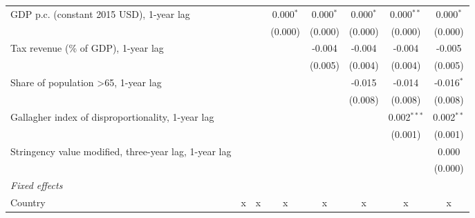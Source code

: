 \begin{table}[htbp]
\begin{tabular}{lccccccc}
      GDP p.c. (constant 2015 USD), 1-year lag                                  &              &              & 0.000$^{*}$    & 0.000$^{*}$    & 0.000$^{*}$    & 0.000$^{**}$   & 0.000$^{*}$\\   
                                                                                &              &              & (0.000)        & (0.000)        & (0.000)        & (0.000)        & (0.000)\\   
      Tax revenue (\% of GDP), 1-year lag                                       &              &              &                & -0.004         & -0.004         & -0.004         & -0.005\\   
                                                                                &              &              &                & (0.005)        & (0.004)        & (0.004)        & (0.005)\\   
      Share of population >65, 1-year lag                                       &              &              &                &                & -0.015         & -0.014         & -0.016$^{*}$\\   
                                                                                &              &              &                &                & (0.008)        & (0.008)        & (0.008)\\   
      Gallagher index of disproportionality, 1-year lag                         &              &              &                &                &                & 0.002$^{***}$  & 0.002$^{**}$\\   
                                                                                &              &              &                &                &                & (0.001)        & (0.001)\\   
      Stringency value modified, three-year lag, 1-year lag                     &              &              &                &                &                &                & 0.000\\   
                                                                                &              &              &                &                &                &                & (0.000)\\   
      \emph{Fixed effects}\\
      Country                                                                   & x            & x            & x              & x              & x              & x              & x\\  

\end{tabular}
\end{table}

